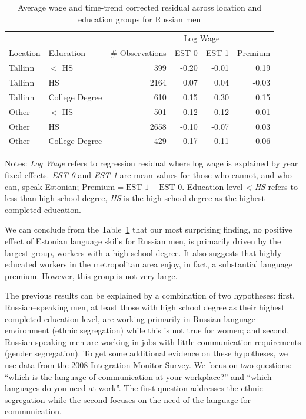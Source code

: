 \documentclass[12pt, a4paper]{article}
\begin{document}
\begin{table}[ht]
 \centering
 \caption{Average wage and time-trend corrected residual across
  location and education groups for Russian men}
 \begin{tabular}{llrrrr}
  \toprule
  & & &\multicolumn{2}{c}{Log Wage}\\
  Location & Education & \# Observations & EST 0 & EST 1 & Premium\\
  \midrule
  Tallinn & $<$ HS & 399 & -0.20 & -0.01 & 0.19 \\ 
  Tallinn & HS & 2164 & 0.07 & 0.04 & -0.03 \\ 
  Tallinn & College Degree & 610 & 0.15 & 0.30 & 0.15 \\ 
  Other & $<$ HS & 501 & -0.12 & -0.12 & -0.01 \\ 
  Other & HS & 2658 & -0.10 & -0.07 & 0.03 \\ 
  Other & College Degree & 429 & 0.17 & 0.11 & -0.06 \\ 
  \bottomrule
 \end{tabular}
 \begin{flushleft}
  Notes: \emph{Log Wage} refers to regression residual where log
  wage is explained by year fixed effects. \emph{EST 0} and
  \emph{EST 1} are mean values for those who cannot, and who can,
  speak Estonian; $\text{Premium} = \text{EST 1} - \text{EST 0}$.
  Education level \emph{< HS} refers to less than high school
  degree, \emph{HS} is the high school degree as the highest
  completed education.
 \end{flushleft}
 \label{tab:loc-lang-edu}
\end{table}

We can conclude from the Table~\ref{tab:loc-lang-edu} that our
most surprising finding, no positive effect of Estonian language
skills for Russian men, is primarily driven by the largest group, workers with
a high school degree. It also suggests that highly educated workers in
the metropolitan area enjoy, in fact, a substantial language premium.
However, this group is not very large.

The previous results can be explained by a combination of two hypotheses: first,
Russian--speaking men, at least those with high school degree as their
highest completed education level, are working
primarily in Russian language environment (ethnic segregation) while this is not true for
women; and second, Russian-speaking men are working in jobs with
little communication requirements (gender segregation).
To get some additional evidence on these hypotheses, we use data
from the 2008 Integration Monitor Survey. We focus on
two questions: ``which is the language of communication at your
workplace?'' and ``which languages do you need at work''. The first
question addresses the ethnic segregation while the second focuses on
the need of the language for communication. 
\end{document}
